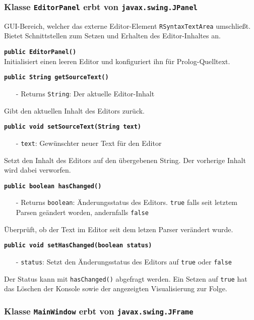 \documentclass[parskip=full,11pt,twoside]{scrartcl}
\begin{document}
\subsubsection{Klasse \texttt{EditorPanel} erbt von \texttt{javax.swing.JPanel}}

GUI-Bereich, welcher das externe Editor-Element \texttt{RSyntaxTextArea} umschließt. Bietet Schnittstellen zum Setzen und Erhalten des Editor-Inhaltes an.

\textbf{\texttt{public EditorPanel()}}\\
Initialisiert einen leeren Editor und konfiguriert ihn für Prolog-Quelltext.

\textbf{\texttt{public String getSourceText()}}
\begin{itemize}[noitemsep]
	\item[-] Returns \texttt{String}: Der aktuelle Editor-Inhalt
\end{itemize}
Gibt den aktuellen Inhalt des Editors zurück.

\textbf{\texttt{public void setSourceText(String text)}}
\begin{itemize}[noitemsep]
	\item[-] \texttt{text}: Gewünschter neuer Text für den Editor
\end{itemize}
Setzt den Inhalt des Editors auf den übergebenen String. Der vorherige Inhalt wird dabei verworfen.

\textbf{\texttt{public boolean hasChanged()}}
\begin{itemize}[noitemsep]
	\item[-] Returns \texttt{boolean}: Änderungsstatus des Editors. \texttt{true} falls seit letztem Parsen geändert worden, andernfalls \texttt{false}
\end{itemize}
Überprüft, ob der Text im Editor seit dem letzen Parser verändert wurde.

\textbf{\texttt{public void setHasChanged(boolean status)}}
\begin{itemize}[noitemsep]
	\item[-] \texttt{status}: Setzt den Änderungsstatus des Editors auf \texttt{true} oder \texttt{false}
\end{itemize}
Der Status kann mit \texttt{hasChanged()} abgefragt werden. Ein Setzen auf \texttt{true} hat das Löschen der Konsole sowie der angezeigten Visualisierung zur Folge.

\subsubsection{Klasse \texttt{MainWindow} erbt von \texttt{javax.swing.JFrame}}
\end{document}
